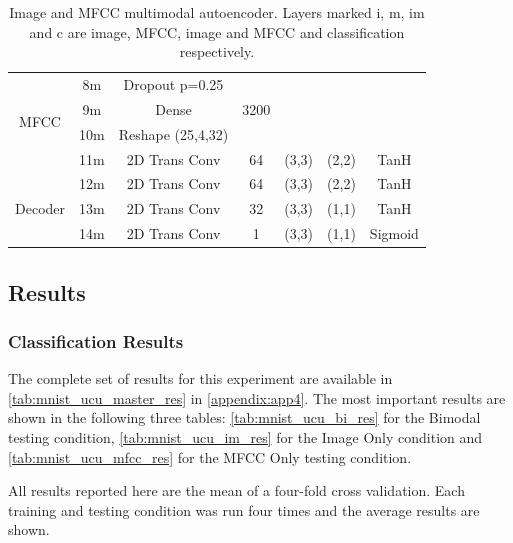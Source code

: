 \begin{table}
\begin{tabular}{|c|c|c|c|c|c|c|}
			\multirow{4}{*}{MFCC} & 8m 	&	Dropout p=0.25 &	 & 	     &        & \\ \cline{2-7}
			& 9m	&	Dense			& 3200 & &           & \\ \cline{2-7}
			& 10m	&	Reshape (25,4,32) & & & &\\ \cline{2-7}
			& 11m	&	2D Trans Conv & 64 & (3,3) & (2,2)  & TanH \\ \cline{2-7}
			\multirow{3}{*}{Decoder}& 12m	&	2D Trans Conv & 64 & (3,3) & (2,2)  & TanH \\ \cline{2-7}
			& 13m	&	2D Trans Conv & 32 & (3,3) & (1,1)  & TanH \\ \cline{2-7}
			& 14m	&	2D Trans Conv & 1 & (3,3) & (1,1)  & Sigmoid\\ \hline
		\end{tabular}
		\caption{Image and MFCC multimodal autoencoder. Layers marked i, m, im and c are image, MFCC, image and MFCC and classification respectively.}
		\label{tab:UCU_MNIST_MAE_description}

	\end{table}




\subsection{Results}

\subsubsection{Classification Results}
The complete set of results for this experiment are available in \autoref{tab:mnist_ucu_master_res} in \autoref{appendix:app4}. The most important results are shown in the following three tables: \autoref{tab:mnist_ucu_bi_res} for the Bimodal testing condition, \autoref{tab:mnist_ucu_im_res} for the Image Only condition and \autoref{tab:mnist_ucu_mfcc_res} for the MFCC Only testing condition. 

All results reported here are the mean of a four-fold cross validation. Each training and testing condition was run four times and the average results are shown.


